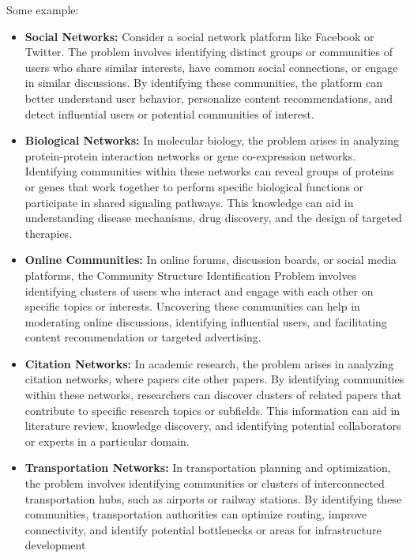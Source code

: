 Some example: 
\begin{itemize}
\item\textbf{Social Networks: }Consider a social network platform like Facebook or Twitter. The problem involves identifying distinct groups or communities of users who share similar interests, have common social connections, or engage in similar discussions. By identifying these communities, the platform can better understand user behavior, personalize content recommendations, and detect influential users or potential communities of interest.
\item\textbf{Biological Networks:} In molecular biology, the problem arises in analyzing protein-protein interaction networks or gene co-expression networks. Identifying communities within these networks can reveal groups of proteins or genes that work together to perform specific biological functions or participate in shared signaling pathways. This knowledge can aid in understanding disease mechanisms, drug discovery, and the design of targeted therapies.
\item\textbf{Online Communities:} In online forums, discussion boards, or social media platforms, the Community Structure Identification Problem involves identifying clusters of users who interact and engage with each other on specific topics or interests. Uncovering these communities can help in moderating online discussions, identifying influential users, and facilitating content recommendation or targeted advertising.
\item\textbf{Citation Networks:} In academic research, the problem arises in analyzing citation networks, where papers cite other papers. By identifying communities within these networks, researchers can discover clusters of related papers that contribute to specific research topics or subfields. This information can aid in literature review, knowledge discovery, and identifying potential collaborators or experts in a particular domain.
\item\textbf{Transportation Networks:} In transportation planning and optimization, the problem involves identifying communities or clusters of interconnected transportation hubs, such as airports or railway stations. By identifying these communities, transportation authorities can optimize routing, improve connectivity, and identify potential bottlenecks or areas for infrastructure development
\end{itemize}

